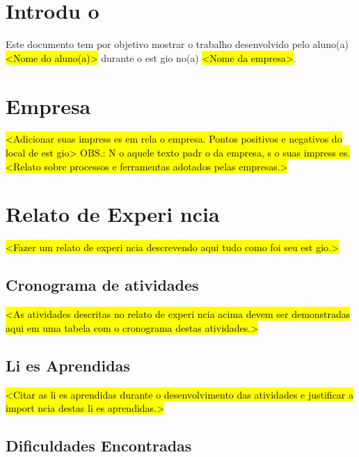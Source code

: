 \documentclass{article}
\begin{document}
\newpage

\section*{Introdu o}


Este documento tem por objetivo mostrar o trabalho desenvolvido pelo aluno(a) \hl{<Nome do aluno(a)>} durante o est gio no(a) \hl{<Nome da empresa>}.

\section*{Empresa}

\hl{<Adicionar suas impress es em rela o   empresa. Pontos positivos e negativos do local de est gio> OBS.: N o   aquele texto padr o da empresa, s o suas impress es. \\
<Relato sobre processos e ferramentas adotados pelas empresas.>
}

\section*{Relato de Experi ncia}

\hl{<Fazer um relato de experi ncia descrevendo aqui tudo como foi seu est gio.>}

\subsection*{Cronograma de atividades}

\hl{<As atividades descritas no relato de experi ncia acima devem ser demonstradas aqui em uma tabela com o cronograma destas atividades.>}

\subsection*{Li es Aprendidas}

\hl{<Citar as li es aprendidas durante o desenvolvimento das atividades e justificar a import ncia destas li es aprendidas.>}

\subsection*{Dificuldades Encontradas}
\end{document}
